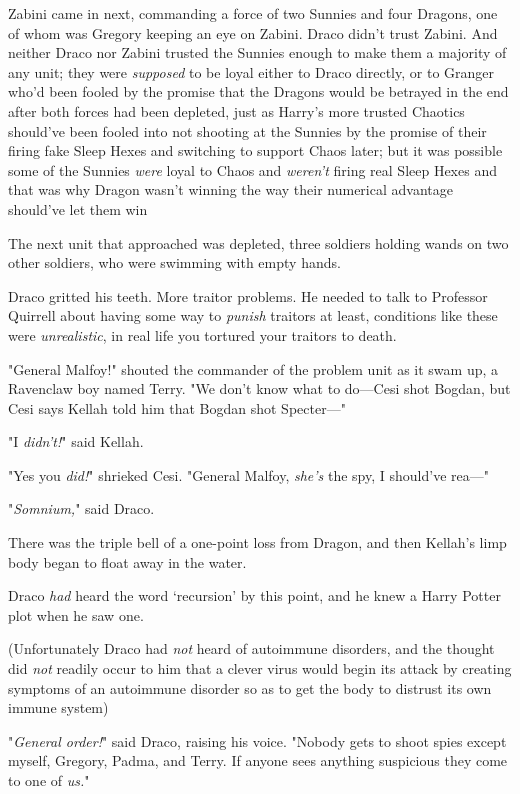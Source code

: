 Zabini came in next, commanding a force of two Sunnies and four Dragons, one of
whom was Gregory keeping an eye on Zabini. Draco didn't trust Zabini. And
neither Draco nor Zabini trusted the Sunnies enough to make them a majority of
any unit; they were \emph{supposed} to be loyal either to Draco directly, or to
Granger who'd been fooled by the promise that the Dragons would be betrayed in
the end after both forces had been depleted, just as Harry's more trusted
Chaotics should've been fooled into not shooting at the Sunnies by the promise
of their firing fake Sleep Hexes and switching to support Chaos later; but it
was possible some of the Sunnies \emph{were} loyal to Chaos and \emph{weren't}
firing real Sleep Hexes and that was why Dragon wasn't winning the way their
numerical advantage should've let them win{\el}

The next unit that approached was depleted, three soldiers holding wands on two
other soldiers, who were swimming with empty hands.

Draco gritted his teeth. More traitor problems. He needed to talk to Professor
Quirrell about having some way to \emph{punish} traitors at least, conditions
like these were \emph{unrealistic}, in real life you tortured your traitors to
death.

"General Malfoy!" shouted the commander of the problem unit as it swam up, a
Ravenclaw boy named Terry. "We don't know what to do---Cesi shot Bogdan, but
Cesi says Kellah told him that Bogdan shot Specter---"

"I \emph{didn't!}" said Kellah.

"Yes you \emph{did!}" shrieked Cesi. "General Malfoy, \emph{she's} the spy, I
should've rea---"

"\emph{Somnium,}" said Draco.

There was the triple bell of a one-point loss from Dragon, and then Kellah's
limp body began to float away in the water.

Draco \emph{had} heard the word `recursion' by this point, and he knew a Harry
Potter plot when he saw one.

(Unfortunately Draco had \emph{not} heard of autoimmune disorders, and the
thought did \emph{not} readily occur to him that a clever virus would begin its
attack by creating symptoms of an autoimmune disorder so as to get the body to
distrust its own immune system{\el})

"\emph{General order!}" said Draco, raising his voice. "Nobody gets to shoot
spies except myself, Gregory, Padma, and Terry. If anyone sees anything
suspicious they come to one of \emph{us.}"

